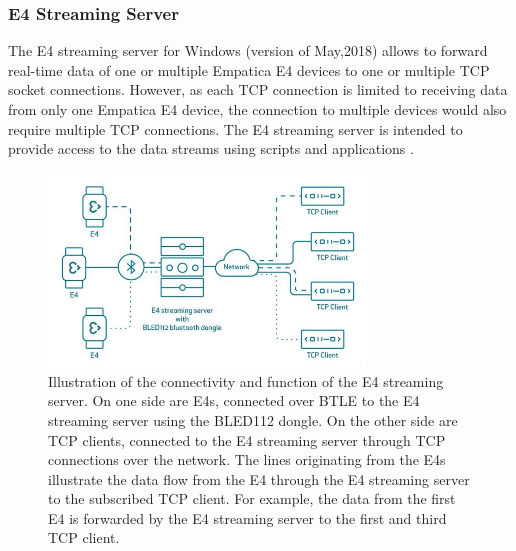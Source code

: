 \subsubsection{E4 Streaming Server}
The E4 streaming server for Windows (version of May,2018) allows to forward real-time data of one or multiple Empatica E4 devices to one or multiple TCP socket connections. However, as each TCP connection is limited to receiving data from only one Empatica E4 device, the connection to multiple devices would also require multiple TCP connections. The E4 streaming server is intended to provide access to the data streams using scripts and applications \cite{E4SS}.\\

\begin{figure}[ht]
	\centering
  \includegraphics[width=0.75\textwidth]{../images/E4streamingServer.JPG}
	\caption[Illustration of the connectivity and function of the E4 streaming server]{Illustration of the connectivity and function of the E4 streaming server. On one side are E4s, connected over BTLE to the E4 streaming server using the BLED112 dongle. On the other side are TCP clients, connected to the E4 streaming server through TCP connections over the network. The lines originating from the E4s illustrate the data flow from the E4 through the E4 streaming server to the subscribed TCP client. For example, the data from the first E4 is forwarded by the E4 streaming server to the first and third TCP client. \cite{E4SS}}
	\label{e4ss}
\end{figure}

